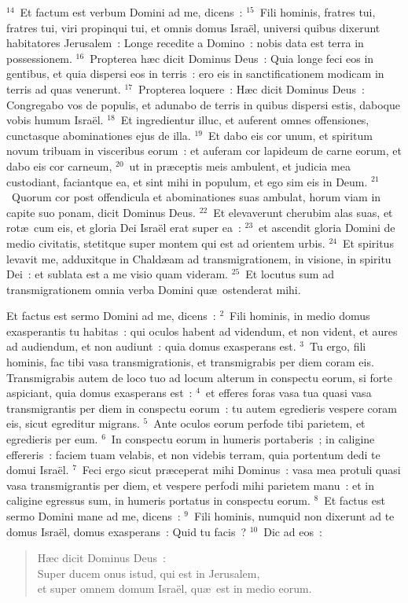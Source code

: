 ${}^{14}$~Et factum est verbum Domini ad me, dicens~:
${}^{15}$~Fili hominis, fratres tui, fratres tui, viri propinqui tui, et omnis domus Isra\"el, universi quibus dixerunt habitatores Jerusalem~: Longe recedite a Domino~: nobis data est terra in possessionem.
${}^{16}$~Propterea h\ae c dicit Dominus Deus~: Quia longe feci eos in gentibus, et quia dispersi eos in terris~: ero eis in sanctificationem modicam in terris ad quas venerunt.
${}^{17}$~Propterea loquere~: H\ae c dicit Dominus Deus~: Congregabo vos de populis, et adunabo de terris in quibus dispersi estis, daboque vobis humum Isra\"el.
${}^{18}$~Et ingredientur illuc, et auferent omnes offensiones, cunctasque abominationes ejus de illa.
${}^{19}$~Et dabo eis cor unum, et spiritum novum tribuam in visceribus eorum~: et auferam cor lapideum de carne eorum, et dabo eis cor carneum,
${}^{20}$~ut in pr\ae ceptis meis ambulent, et judicia mea custodiant, faciantque ea, et sint mihi in populum, et ego sim eis in Deum.
${}^{21}$~Quorum cor post offendicula et abominationes suas ambulat, horum viam in capite suo ponam, dicit Dominus Deus.
${}^{22}$~Et elevaverunt cherubim alas suas, et rot\ae\ cum eis, et gloria Dei Isra\"el erat super ea~:
${}^{23}$~et ascendit gloria Domini de medio civitatis, stetitque super montem qui est ad orientem urbis.
${}^{24}$~Et spiritus levavit me, adduxitque in Chald\ae am ad transmigrationem, in visione, in spiritu Dei~: et sublata est a me visio quam videram.
${}^{25}$~Et locutus sum ad transmigrationem omnia verba Domini qu\ae\ ostenderat mihi.

\lettrine[lines=10,image=true,loversize=0.05,lraise=-0.03]{E}{}t factus est sermo Domini ad me, dicens~:
${}^{2}$~Fili hominis, in medio domus exasperantis tu habitas~: qui oculos habent ad videndum, et non vident, et aures ad audiendum, et non audiunt~: quia domus exasperans est.
${}^{3}$~Tu ergo, fili hominis, fac tibi vasa transmigrationis, et transmigrabis per diem coram eis. Transmigrabis autem de loco tuo ad locum alterum in conspectu eorum, si forte aspiciant, quia domus exasperans est~:
${}^{4}$~et efferes foras vasa tua quasi vasa transmigrantis per diem in conspectu eorum~: tu autem egredieris vespere coram eis, sicut egreditur migrans.
${}^{5}$~Ante oculos eorum perfode tibi parietem, et egredieris per eum.
${}^{6}$~In conspectu eorum in humeris portaberis~; in caligine effereris~: faciem tuam velabis, et non videbis terram, quia portentum dedi te domui Isra\"el.
${}^{7}$~Feci ergo sicut pr\ae ceperat mihi Dominus~: vasa mea protuli quasi vasa transmigrantis per diem, et vespere perfodi mihi parietem manu~: et in caligine egressus sum, in humeris portatus in conspectu eorum.
${}^{8}$~Et factus est sermo Domini mane ad me, dicens~:
${}^{9}$~Fili hominis, numquid non dixerunt ad te domus Isra\"el, domus exasperans~: Quid tu facis~?
${}^{10}$~Dic ad eos~: \begin{flushleft}\begin{verse}H\ae c dicit Dominus Deus~:\\ Super ducem onus istud, qui est in Jerusalem,\\ et super omnem domum Isra\"el, qu\ae\ est in medio eorum.\end{verse}\end{flushleft}


